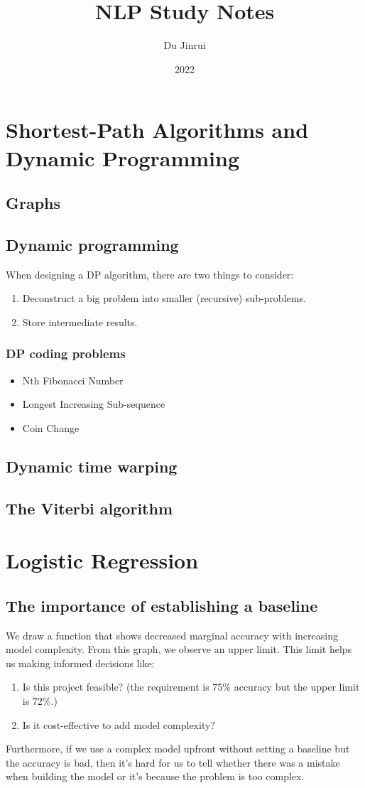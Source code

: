 \documentclass{report}
\title{NLP Study Notes}
\author{Du Jinrui}
\date{2022} \usepackage[b6paper, margin=0.5in]{geometry}
\begin{document}
  \maketitle
  \tableofcontents
  \chapter{Shortest-Path Algorithms and Dynamic Programming}
  \section{Graphs}
  \section{Dynamic programming}
  When designing a DP algorithm, there are two things to consider:
  \begin{enumerate}
  	\item Deconstruct a big problem into smaller (recursive) sub-problems.
	\item Store intermediate results.
  \end{enumerate}
  \subsection{DP coding problems}
  \begin{itemize}
    \item Nth Fibonacci Number
    \item Longest Increasing Sub-sequence
    \item Coin Change
  \end{itemize}
  \section{Dynamic time warping}
  \section{The Viterbi algorithm}
  \chapter{Logistic Regression}
  \section{The importance of establishing a baseline}
  We draw a function that shows decreased marginal accuracy with increasing model complexity. From this graph, we observe an upper limit. This limit helps us making informed decisions like:
		\begin{enumerate}
			\item Is this project feasible? (the requirement is 75\% accuracy but the upper limit is 72\%.)
			\item Is it cost-effective to add model complexity?
		\end{enumerate}
Furthermore, if we use a complex model upfront without setting a baseline but the accuracy is bad, then it's hard for us to tell whether there was a mistake when building the model or it's because the problem is too complex.
\end{document}
